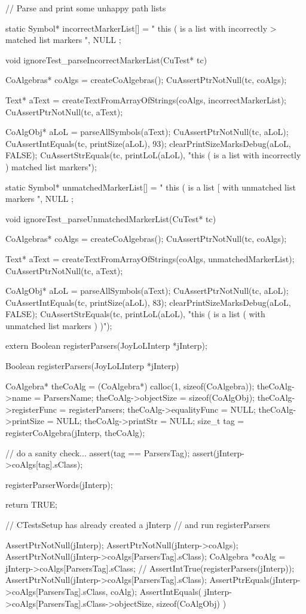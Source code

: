 // Parse and print some unhappy path lists

static Symbol* incorrectMarkerList[] = {
  " this ( is a list with incorrectly > matched list markers ",
  NULL
};

void ignoreTest_parseIncorrectMarkerList(CuTest* tc) {
  CoAlgebras* coAlgs = createCoAlgebras();
  CuAssertPtrNotNull(tc, coAlgs);

  Text* aText = createTextFromArrayOfStrings(coAlgs, incorrectMarkerList);
  CuAssertPtrNotNull(tc, aText);

  CoAlgObj* aLoL = parseAllSymbols(aText);
  CuAssertPtrNotNull(tc, aLoL);
  CuAssertIntEquals(tc, printSize(aLoL), 93);
  clearPrintSizeMarksDebug(aLoL, FALSE);
  CuAssertStrEquals(tc, printLoL(aLoL),
    "this ( is a list with incorrectly ) matched list markers");
}

static Symbol* unmatchedMarkerList[] = {
  " this ( is a list [ with unmatched list markers ",
  NULL
};

void ignoreTest_parseUnmatchedMarkerList(CuTest* tc) {
  CoAlgebras* coAlgs = createCoAlgebras();
  CuAssertPtrNotNull(tc, coAlgs);

  Text* aText = createTextFromArrayOfStrings(coAlgs, unmatchedMarkerList);
  CuAssertPtrNotNull(tc, aText);

  CoAlgObj* aLoL = parseAllSymbols(aText);
  CuAssertPtrNotNull(tc, aLoL);
  CuAssertIntEquals(tc, printSize(aLoL), 83);
  clearPrintSizeMarksDebug(aLoL, FALSE);
  CuAssertStrEquals(tc, printLoL(aLoL),
    "this ( is a list ( with unmatched list markers ) )");
}
\stoptyping

\startTestSuite[registerParsers]

\startCHeader
extern Boolean registerParsers(JoyLoLInterp *jInterp);
\stopCHeader
{}

\startCCode
Boolean registerParsers(JoyLoLInterp *jInterp) {
  CoAlgebra* theCoAlg    = (CoAlgebra*) calloc(1, sizeof(CoAlgebra));
  theCoAlg->name         = ParsersName;
  theCoAlg->objectSize   = sizeof(CoAlgObj);
  theCoAlg->registerFunc = registerParsers;
  theCoAlg->equalityFunc = NULL;
  theCoAlg->printSize    = NULL;
  theCoAlg->printStr     = NULL;
  size_t tag = registerCoAlgebra(jInterp, theCoAlg);
  
  // do a sanity check...
  assert(tag == ParsersTag);
  assert(jInterp->coAlgs[tag].sClass);
  
  registerParserWords(jInterp);
    
  return TRUE;
}
\stopCCode


\startCTest
  // CTestsSetup has already created a jInterp
  // and run registerParsers
  
  AssertPtrNotNull(jInterp);
  AssertPtrNotNull(jInterp->coAlgs);
  AssertPtrNotNull(jInterp->coAlgs[ParsersTag].sClass);
  CoAlgebra *coAlg = jInterp->coAlgs[ParsersTag].sClass;
//  AssertIntTrue(registerParsers(jInterp));
  AssertPtrNotNull(jInterp->coAlgs[ParsersTag].sClass);
  AssertPtrEquals(jInterp->coAlgs[ParsersTag].sClass, coAlg);
  AssertIntEquals(
    jInterp->coAlgs[ParsersTag].sClass->objectSize,
    sizeof(CoAlgObj)
  )
\stopCTest
\stopTestCase
\stopTestSuite
